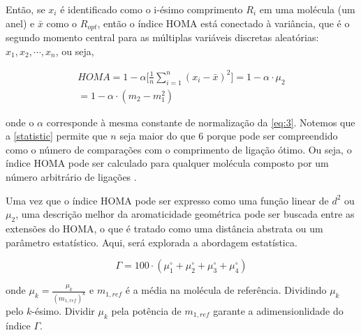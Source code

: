 Então, se $x_i$ é identificado como o i-ésimo comprimento $R_i$ em uma molécula (um anel) e $\bar{x}$ como o $R_{opt}$, então o índice \gls{HOMA} está conectado à variância, que é o segundo momento central para as múltiplas variáveis discretas aleatórias: $x_1, x_2, \cdots, x_n$, ou seja, 

\begin{equation}
\label{statistic}
\begin{split}
    HOMA = 1 - \alpha \bigg[\frac{1}{n} \sum_{i=1}^n (x_i - \bar{x})^2 \bigg] = 1 - \alpha \cdot \mu_2 \\ = 1 - \alpha \cdot (m_2 - m_1^2 )
\end{split}
\end{equation}

\noindent onde o $\alpha$ corresponde à mesma constante de normalização da \autoref{eq:3}. Notemos que a \autoref{statistic} permite que $n$ seja maior do que 6 porque pode ser compreendido como o número de comparações com o comprimento de ligação ótimo. Ou seja, o índice \gls{HOMA} pode ser calculado para qualquer molécula composto por um número arbitrário de ligações .

Uma vez que o índice \gls{HOMA} pode ser expresso como uma função linear de $d^2$ ou $\mu_2$, uma descrição melhor da aromaticidade geométrica pode ser buscada entre as extensões do \gls{HOMA}, o que é tratado como uma distância abstrata ou um parâmetro estatístico. Aqui, será explorada a abordagem estatística.

\begin{equation}
    \Gamma = 100 \cdot (\mu_1^\circ + \mu_2^\circ + \mu_3^\circ + \mu_4^\circ)
\end{equation}

\noindent onde $\mu_k = \displaystyle \frac{\mu_k}{(m_{1, ref})^k}$ e $m_{1, ref}$ é a média na molécula de referência. Dividindo $\mu_k$ pelo $k$-ésimo. Dividir $\mu_k$ pela potência de $m_{1, ref}$ garante a adimensionlidade do índice $\Gamma$.